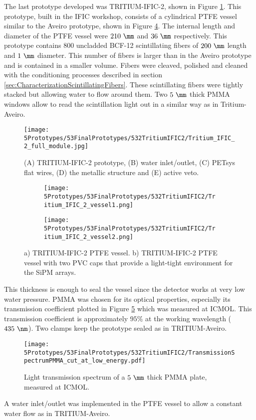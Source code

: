 The last prototype developed was TRITIUM-IFIC-2, shown in Figure \ref{fig:TritiumIFIC2}. This prototype, built in the IFIC workshop, consists of a cylindrical PTFE vessel similar to the Aveiro prototype, shown in Figure \ref{fig:Tritium-IFIC2_vessels}. The internal length and diameter of the PTFE vessel were $210~\mm$ and $36~\mm$ respectively. This prototype contains $800$ uncladded BCF-12 scintillating fibers of $200~\mm$ length and $1~\mm$ diameter. This number of fibers is larger than in the Aveiro prototype and is contained in a smaller volume. Fibers were cleaved, polished and cleaned with the conditioning processes described in section \ref{sec:CharacterizationScintillatingFibers}. These scintillating fibers were tightly stacked but allowing water to flow around them. Two $5~\mm$ thick PMMA windows allow to read the scintillation light out in a similar way as in Tritium-Aveiro. 
\begin{figure}[h]
\centering
\texttt{[image: 5Prototypes/53FinalPrototypes/532TritiumIFIC2/Tritium\_IFIC\_2\_full\_module.jpg]}
\caption{(A) TRITIUM-IFIC-2 prototype, (B) water inlet/outlet, (C) PETsys flat wires, (D) the metallic structure and (E) active veto.\label{fig:TritiumIFIC2}}
\end{figure}
\begin{figure}
\centering
    \begin{subfigure}[b]{0.35\textwidth}
    \centering
    \texttt{[image: 5Prototypes/53FinalPrototypes/532TritiumIFIC2/Tritium\_IFIC\_2\_vessel1.png]}  
    \caption{\label{subfig:Tritium_IFIC_2_vessel}}
    \end{subfigure}
    \hfill
    \begin{subfigure}[b]{0.3\textwidth}
    \centering
    \texttt{[image: 5Prototypes/53FinalPrototypes/532TritiumIFIC2/Tritium\_IFIC\_2\_vessel2.png]}  
    \caption{\label{subfig:TritiumIFIC2_vessel_with_PVC_caps}}
    \end{subfigure}
 \caption{a) TRITIUM-IFIC-2 PTFE vessel. b) TRITIUM-IFIC-2 PTFE vessel with two PVC caps that provide a light-tight environment for the SiPM arrays.}
 \label{fig:Tritium-IFIC2_vessels}
\end{figure}
This thickness is enough to seal the vessel since the detector works at very low water pressure. PMMA was chosen for its optical properties, especially its transmission coefficient plotted in Figure \ref{fig:PMMATransmissionSpectrum} which was measured at ICMOL. This transmission coefficient is approximately $95\%$ at the working wavelength ($435~\nm$). Two clamps keep the prototype sealed as in TRITIUM-Aveiro.
\begin{figure}[h]
\centering
\texttt{[image: 5Prototypes/53FinalPrototypes/532TritiumIFIC2/TransmissionSpectrumPMMA\_cut\_at\_low\_energy.pdf]}
\caption{Light transmission spectrum of a $5~\mm$ thick PMMA plate, measured at ICMOL. \label{fig:PMMATransmissionSpectrum}}
\end{figure}	
A water inlet/outlet was implemented in the PTFE vessel to allow a constant water flow as in TRITIUM-Aveiro. 

